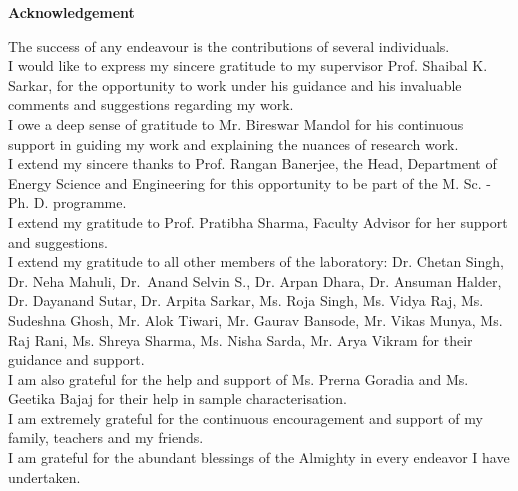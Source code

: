 \begin{center}
    \textbf{\LARGE Acknowledgement}
\end{center}
\noindent
The success of any endeavour is the contributions of several individuals.\smallskip\\

\noindent
I would like to express my sincere gratitude to my supervisor Prof. Shaibal K. Sarkar, for the opportunity to work under his guidance and his invaluable comments and suggestions regarding my work.\smallskip\\

\noindent
I owe a deep sense of gratitude to Mr. Bireswar Mandol for his continuous support in guiding my work and explaining the nuances of research work.\smallskip\\

\noindent
I extend my sincere thanks to Prof. Rangan Banerjee, the Head, Department of Energy Science and Engineering for this opportunity to be part of the M. Sc. - Ph. D. programme.\smallskip\\

\noindent
I extend my gratitude to Prof. Pratibha Sharma, Faculty Advisor for her support and suggestions.\smallskip\\

\noindent
I extend my gratitude to all other members of the laboratory: Dr. Chetan Singh, Dr. Neha Mahuli, Dr.~Anand Selvin S., Dr. Arpan Dhara, Dr. Ansuman Halder, Dr. Dayanand Sutar, Dr. Arpita Sarkar, Ms. Roja Singh, Ms. Vidya Raj, Ms. Sudeshna Ghosh, Mr. Alok Tiwari, Mr. Gaurav Bansode, Mr. Vikas Munya, Ms. Raj Rani, Ms. Shreya Sharma, Ms. Nisha Sarda, Mr. Arya Vikram for their guidance and support.\smallskip\\

\noindent
I am also grateful for the help and support of Ms. Prerna Goradia and Ms. Geetika Bajaj for their help in sample characterisation.\smallskip\\  

\noindent
I am extremely grateful for the continuous encouragement and support of my family, teachers and my friends.\smallskip\\

\noindent
I am grateful for the abundant blessings of the Almighty in every endeavor I have undertaken.
